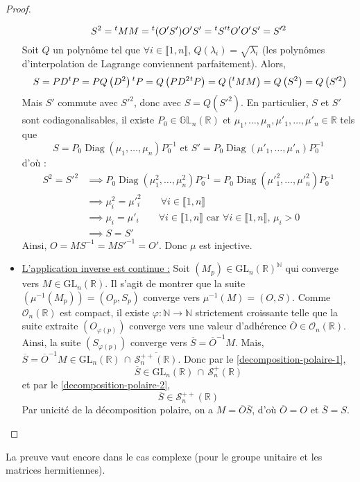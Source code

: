 \begin{proof}
\begin{itemize}
      \[ S^2 = \mathstrut ^t M M = \mathstrut ^t (O'S') O'S' = \mathstrut ^t S' \mathstrut ^t O' O' S' = S'^{2} \]
      Soit $Q$ un polynôme tel que $\forall i \in \llbracket 1, n \rrbracket$, $Q(\lambda_i) = \sqrt{\lambda_i}$ (les polynômes d'interpolation de Lagrange conviennent parfaitement). Alors,
      \[\ S = PD \mathstrut ^t P = PQ \left(D^2 \right) \mathstrut ^t P = Q \left(PD^2 \mathstrut ^t P \right) = Q \left(\mathstrut ^t M M \right) = Q \left(S^2 \right) = Q \left(S'^2 \right) \]
      Mais $S'$ commute avec $S'^2$, donc avec $S = Q \left(S'^2 \right)$. En particulier, $S$ et $S'$ sont codiagonalisables, il existe $P_0 \in \mathbb{GL}_n(\mathbb{R})$ et $\mu_1, \dots, \mu_n, \mu'_1, \dots, \mu'_n \in \mathbb{R}$ tels que
      \[ S = P_0 \operatorname{Diag}(\mu_1, \dots, \mu_n) P_0^{-1} \text{ et } S' = P_0 \operatorname{Diag} \left (\mu'_1, \dots, \mu'_n \right) P_0^{-1} \]
      d'où :
      \begin{align*}
        S^2 = S'^2 & \implies P_0 \operatorname{Diag} \left(\mu^2_1, \dots, \mu^2_n \right) P_0^{-1} = P_0 \operatorname{Diag} \left (\mu'^2_1, \dots, \mu'^2_n \right) P_0^{-1} \\
        & \implies \mu^2_i = \mu'^2_i \qquad \forall i \in \llbracket 1, n \rrbracket \\
        & \implies \mu_i = \mu'_i \qquad \forall i \in \llbracket 1, n \rrbracket \text{ car } \forall i \in \llbracket 1, n \rrbracket, \, \mu_i > 0 \\
        & \implies S = S'
      \end{align*}
      Ainsi, $O = MS^{-1} = MS'^{-1} = O'$. Donc $\mu$ est injective.
      \item \uline{L'application inverse est continue :} Soit $(M_p) \in \mathrm{GL}_n(\mathbb{R})^{\mathbb{N}}$ qui converge vers $M \in \mathrm{GL}_n(\mathbb{R})$. Il s'agit de montrer que la suite $\left (\mu^{-1} \left (M_p \right) \right) = (O_p, S_p)$ converge vers $\mu^{-1}(M) = (O, S)$. Comme $\mathcal{O}_n(\mathbb{R})$ est compact, il existe $\varphi : \mathbb{N} \rightarrow \mathbb{N}$ strictement croissante telle que la suite extraite $(O_{\varphi(p)})$ converge vers une valeur d'adhérence $\overline{O} \in \mathcal{O}_n(\mathbb{R})$. Ainsi, la suite $(S_{\varphi(p)})$ converge vers $\overline{S} = \overline{O}^{-1} M$.
      \newpar
      Mais, $\overline{S} = \overline{O}^{-1} M \in \mathrm{GL}_n(\mathbb{R}) \, \cap \, \overline{\mathcal{S}_n^{++}(\mathbb{R})}$. Donc par le \cref{decomposition-polaire-1},
      \[ \overline{S} \in \mathrm{GL}_n(\mathbb{R}) \, \cap \, \mathcal{S}_n^{+}(\mathbb{R}) \]
      et par le \cref{decomposition-polaire-2},
      \[ \overline{S} \in \mathcal{S}_n^{++}(\mathbb{R}) \]
      Par unicité de la décomposition polaire, on a $M = \overline{O} \overline{S}$, d'où $\overline{O} = O$ et $\overline{S} = S$.
    \end{itemize}
  \end{proof}

  \begin{remark}
    La preuve vaut encore dans le cas complexe (pour le groupe unitaire et les matrices hermitiennes).
  \end{remark}

